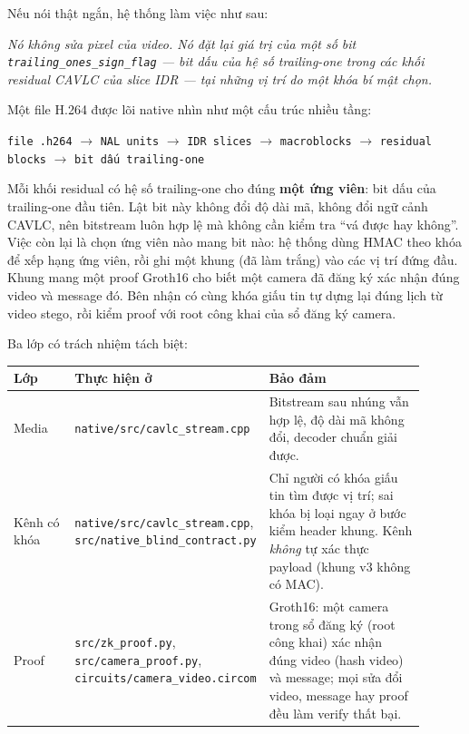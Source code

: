 \documentclass[11pt,a4paper]{article}
\begin{document}
Nếu nói thật ngắn, hệ thống làm việc như sau:

\begin{center}
\textit{Nó không sửa pixel của video. Nó đặt lại giá trị của một số bit
\texttt{trailing\_ones\_sign\_flag} --- bit dấu của hệ số trailing-one trong các
khối residual CAVLC của slice IDR --- tại những vị trí do một khóa bí mật chọn.}
\end{center}

Một file H.264 được lõi native nhìn như một cấu trúc nhiều tầng:

\begin{center}
\texttt{file .h264}
\(\rightarrow\)
\texttt{NAL units}
\(\rightarrow\)
\texttt{IDR slices}
\(\rightarrow\)
\texttt{macroblocks}
\(\rightarrow\)
\texttt{residual blocks}
\(\rightarrow\)
\texttt{bit dấu trailing-one}
\end{center}

Mỗi khối residual có hệ số trailing-one cho đúng \textbf{một ứng viên}: bit dấu
của trailing-one đầu tiên. Lật bit này không đổi độ dài mã, không đổi ngữ cảnh
CAVLC, nên bitstream luôn hợp lệ mà không cần kiểm tra ``vá được hay không''.
Việc còn lại là chọn ứng viên nào mang bit nào: hệ thống dùng HMAC theo khóa để
xếp hạng ứng viên, rồi ghi một khung (đã làm trắng) vào các vị trí đứng đầu. Khung
mang một proof Groth16 cho biết một camera đã đăng ký xác nhận đúng video và message
đó. Bên nhận có cùng khóa giấu tin tự dựng lại đúng lịch từ video stego, rồi kiểm
proof với root công khai của sổ đăng ký camera.

Ba lớp có trách nhiệm tách biệt:

\begin{center}
\small
\begin{tabular}{>{\raggedright\arraybackslash}p{0.15\linewidth}>{\raggedright\arraybackslash}p{0.36\linewidth}>{\raggedright\arraybackslash}p{0.39\linewidth}}
\toprule
Lớp & Thực hiện ở & Bảo đảm \\
\midrule
Media & \nolinkurl{native/src/cavlc_stream.cpp} & Bitstream sau nhúng vẫn hợp lệ, độ dài mã không đổi, decoder chuẩn giải được. \\
Kênh có khóa & \nolinkurl{native/src/cavlc_stream.cpp}, \nolinkurl{src/native_blind_contract.py} & Chỉ người có khóa giấu tin tìm được vị trí; sai khóa bị loại ngay ở bước kiểm header khung. Kênh \emph{không} tự xác thực payload (khung v3 không có MAC). \\
Proof & \nolinkurl{src/zk_proof.py}, \nolinkurl{src/camera_proof.py}, \nolinkurl{circuits/camera_video.circom} & Groth16: một camera trong sổ đăng ký (root công khai) xác nhận đúng video (hash video) và message; mọi sửa đổi video, message hay proof đều làm verify thất bại. \\
\bottomrule
\end{tabular}
\end{center}
\end{document}

